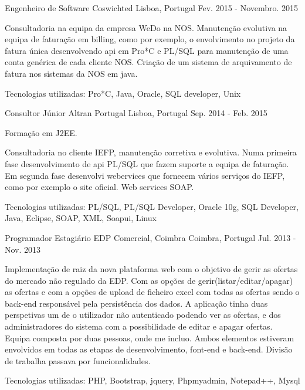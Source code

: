 \begin{cventries}
\cventry
{Engenheiro de Software} %
{Coswichted } %
{Lisboa, Portugal} %
{Fev. 2015 - Novembro. 2015} %
{ %
\begin{cvitems}
\item {Consultadoria na equipa da empresa WeDo na NOS. Manutenção evolutiva na equipa de faturação em billing, como por exemplo, o envolvimento no projeto da fatura única desenvolvendo api em Pro*C e PL/SQL para manutenção de uma conta genérica de cada cliente NOS. Criação de um sistema de arquivamento de fatura nos sistemas da NOS em java.}
\item {Tecnologias utilizadas: Pro*C, Java, Oracle, SQL developer, Unix}
\end{cvitems}
}


\cventry
{Consultor Júnior} %
{Altran Portugal} %
{Lisboa, Portugal} %
{Sep. 2014 - Feb. 2015} %
{ %
\begin{cvitems}
\item {Formação em J2EE.}
\item {Consultadoria no cliente IEFP, manutenção corretiva e evolutiva. Numa primeira fase desenvolvimento de api PL/SQL que fazem suporte a equipa de faturação. Em segunda fase desenvolvi webervices que fornecem vários serviços do IEFP, como por exemplo o site oficial. Web services SOAP. }
\item{Tecnologias utilizadas: PL/SQL, PL/SQL Developer, Oracle 10g, SQL Developer, Java, Eclipse, SOAP, XML, Soapui, Linux  }
\end{cvitems} 
}


\cventry
{Programador Estagiário} %
{EDP Comercial, Coimbra} %
{Coimbra, Portugal} %
{Jul. 2013 - Nov. 2013} %
{ %
\begin{cvitems}
\item {Implementação de raiz da nova plataforma web com o objetivo de gerir as ofertas do mercado não regulado da EDP. Com as opções de gerir(listar/editar/apagar) as ofertas e com a opções de upload de ficheiro excel com todas as ofertas sendo o back-end responsável pela persistência dos dados. A aplicação tinha duas perspetivas um de o utilizador não autenticado podendo ver as ofertas, e dos administradores do sistema com a possibilidade de editar e apagar ofertas. Equipa composta por duas pessoas, onde me incluo. Ambos elementos estiveram envolvidos em todas as etapas de desenvolvimento, font-end e back-end. Divisão de trabalha passava por funcionalidades.}
\item{Tecnologias utilizadas: PHP, Bootstrap, jquery, Phpmyadmin, Notepad++, Mysql }
\end{cvitems}
}


\end{cventries}
